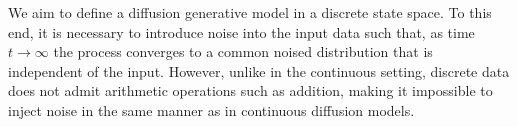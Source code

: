 \documentclass[11pt, a4paper]{article}
\begin{document}

We aim to define a diffusion generative model in a discrete state space. To this end, it is necessary to introduce noise into the input data such that, as time \(t\rightarrow\infty\) the process converges to a common noised distribution that is independent of the input.
However, unlike in the continuous setting, discrete data does not admit arithmetic operations such as addition, making it impossible to inject noise in the same manner as in continuous diffusion models.
\end{document}
